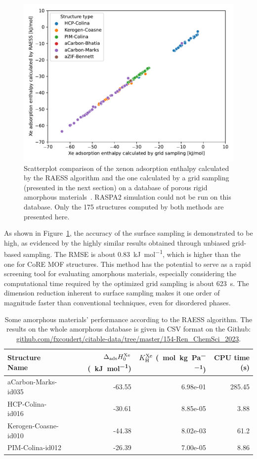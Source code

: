 \documentclass[main]{subfiles}
\begin{document}
\begin{figure}[ht]
  \centering
  \includegraphics[width=0.5\linewidth]{figures/3-fastsim/amorphous_enthalpy.pdf}
  \caption{Scatterplot comparison of the xenon adsorption enthalpy calculated by the RAESS algorithm and the one calculated by a grid sampling (presented in the next section) on a database of porous rigid amorphous materials~\autocite{Thyagarajan_2020}. RASPA2 simulation could not be run on this database. Only the 175 structures computed by both methods are presented here. }\label{fgr:amorphous}
\end{figure}

As shown in Figure~\ref{fgr:amorphous}, the accuracy of the surface sampling is demonstrated to be high, as evidenced by the highly similar results obtained through unbiased grid-based sampling. The RMSE is about \SI{0.83}{\kJ\per\mol}, which is higher than the one for CoRE MOF structures. This method has the potential to serve as a rapid screening tool for evaluating amorphous materials, especially considering the computational time required by the optimized grid sampling is about \SI{623}{\second}. The dimension reduction inherent to surface sampling makes it one order of magnitude faster than conventional techniques, even for disordered phases.

\begin{table}[hb]
  \setlength{\extrarowheight}{1pt}
  \caption{Some amorphous materials' performance according to the RAESS algorithm. The results on the whole amorphous database is given in CSV format on the Github: \url{github.com/fxcoudert/citable-data/tree/master/154-Ren_ChemSci_2023}.}\label{tab:amorphous}  \centering
  \begin{tabular}{|l|r|r|r|}
    \hline
    Structure Name & $\Delta_{\text{ads}}H_{\text{0}}^{\text{Xe}}$ (\SI{}{\kilo\joule\per\mole}) & $K_{\text{H}}^{\text{Xe}}$ (\SI{}{\mole\per\kilo\gram\per\pascal}) & CPU time (s) \\
    \hline
    aCarbon-Marks-id035 &                 -63.55 &            6.98e-01 & 285.45 \\
    HCP-Colina-id016 &                 -30.61 &            8.85e-05 & 3.88 \\
    Kerogen-Coasne-id010 &                 -44.38 &            8.02e-03 & 61.2 \\
    PIM-Colina-id012 &                 -26.39 &            7.00e-05 & 8.86 \\
    \hline
    \end{tabular}
\end{table}
\end{document}
